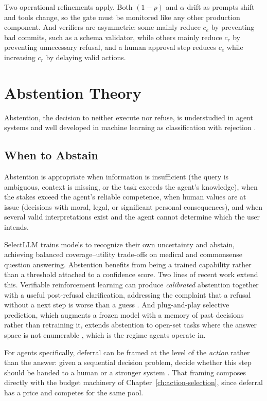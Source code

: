 \documentclass[11pt]{book}
\begin{document}
Two operational refinements apply. Both $(1-p)$ and $\alpha$ drift as prompts shift and tools change, so the gate must be monitored like any other production component. And verifiers are asymmetric: some mainly reduce $c_e$ by preventing bad commits, such as a schema validator, while others mainly reduce $c_r$ by preventing unnecessary refusal, and a human approval step reduces $c_e$ while increasing $c_r$ by delaying valid actions.

\section{Abstention Theory}

Abstention, the decision to neither execute nor refuse, is understudied in agent systems and well developed in machine learning as classification with rejection \cite{hendrickx2024survey, wen2024abstention}.

\subsection{When to Abstain}

Abstention is appropriate when information is insufficient (the query is ambiguous, context is missing, or the task exceeds the agent's knowledge), when the stakes exceed the agent's reliable competence, when human values are at issue (decisions with moral, legal, or significant personal consequences), and when several valid interpretations exist and the agent cannot determine which the user intends.

SelectLLM \cite{yoshikawa2025selectllm} trains models to recognize their own uncertainty and abstain, achieving balanced coverage--utility trade-offs on medical and commonsense question answering. Abstention benefits from being a trained capability rather than a threshold attached to a confidence score. Two lines of recent work extend this. Verifiable reinforcement learning can produce \textit{calibrated} abstention together with a useful post-refusal clarification, addressing the complaint that a refusal without a next step is worse than a guess \cite{abstainr12026}. And plug-and-play selective prediction, which augments a frozen model with a memory of past decisions rather than retraining it, extends abstention to open-set tasks where the answer space is not enumerable \cite{selectivepred2026}, which is the regime agents operate in.

For agents specifically, deferral can be framed at the level of the \textit{action} rather than the answer: given a sequential decision problem, decide whether this step should be handed to a human or a stronger system \cite{redact2026}. That framing composes directly with the budget machinery of Chapter~\ref{ch:action-selection}, since deferral has a price and competes for the same pool.
\end{document}
